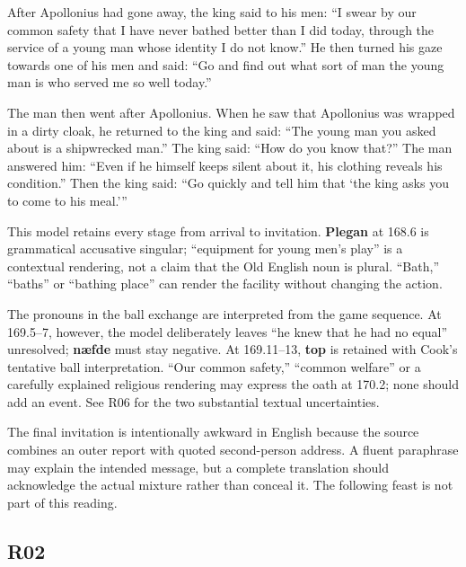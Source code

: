 After Apollonius had gone away, the king said to his men: “I swear by our common safety that I have never bathed better than I did today, through the service of a young man whose identity I do not know.” He then turned his gaze towards one of his men and said: “Go and find out what sort of man the young man is who served me so well today.”

The man then went after Apollonius. When he saw that Apollonius was wrapped in a dirty cloak, he returned to the king and said: “The young man you asked about is a shipwrecked man.” The king said: “How do you know that?” The man answered him: “Even if he himself keeps silent about it, his clothing reveals his condition.” Then the king said: “Go quickly and tell him that ‘the king asks you to come to his meal.’”

This model retains every stage from arrival to invitation. \textbf{Plegan} at 168.6 is grammatical accusative singular; “equipment for young men’s play” is a contextual rendering, not a claim that the Old English noun is plural. “Bath,” “baths” or “bathing place” can render the facility without changing the action.

The pronouns in the ball exchange are interpreted from the game sequence. At 169.5–7, however, the model deliberately leaves “he knew that he had no equal” unresolved; \textbf{næfde} must stay negative. At 169.11–13, \textbf{top} is retained with Cook’s tentative ball interpretation. “Our common safety,” “common welfare” or a carefully explained religious rendering may express the oath at 170.2; none should add an event. See R06 for the two substantial textual uncertainties.

The final invitation is intentionally awkward in English because the source combines an outer report with quoted second-person address. A fluent paraphrase may explain the intended message, but a complete translation should acknowledge the actual mixture rather than conceal it. The following feast is not part of this reading.

\subsection*{R02}

